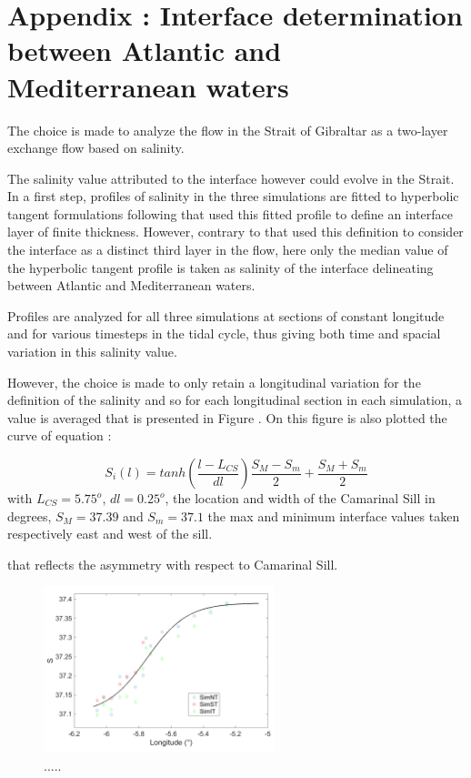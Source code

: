  \color{red}
\section{Appendix : Interface determination between Atlantic and Mediterranean waters}
\label{appendix_interface}

The choice is made to analyze the flow in the Strait of Gibraltar as a two-layer exchange flow based on salinity. 

The salinity value attributed to the interface however could evolve in the Strait. In a first step, profiles of salinity in the three simulations are fitted to hyperbolic tangent formulations following \citet{sannino_2007} that used this fitted profile to define an interface layer of finite thickness. However, contrary to \citet{sannino_2007} that used this definition to consider the interface as a distinct third layer in the flow, here only the median value of the hyperbolic tangent profile is taken as salinity of the interface delineating between Atlantic and Mediterranean waters.

Profiles are analyzed for all three simulations at sections of constant longitude and for various timesteps in the tidal cycle, thus giving both time and spacial variation in this salinity value.

However, the choice is made to only retain a longitudinal variation for the definition of the salinity and so for each longitudinal section in each simulation, a value is averaged that is presented in Figure . On this figure is also plotted the curve of equation :

\begin{equation}
	S_i(l)=tanh(\frac{l-L_{CS}}{dl})\frac{S_M-S_m}{2}+\frac{S_M+S_m}{2}
	\label{eqSinterface}
\end{equation}
with $L_{CS}=5.75^o$, $dl=0.25^o$, the location and width of the Camarinal Sill in degrees, $S_M=37.39$ and $S_m=37.1$ the max and minimum interface values taken respectively east and west of the sill.

that reflects the asymmetry with respect to Camarinal Sill.


\begin{figure}[!h]
 \centering
 \includegraphics[width=0.6\textwidth]{./GBR3D/salinite_interface_papier.png}
 \caption [......]{.....}
 \label{fig_defintf}
\end{figure}


